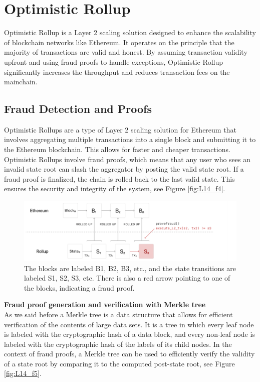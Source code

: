 \section{Optimistic Rollup}
Optimistic Rollup is a Layer 2 scaling solution designed to enhance the scalability of blockchain networks like Ethereum. It operates on the principle that the majority of transactions are valid and honest. By assuming transaction validity upfront and using fraud proofs to handle exceptions, Optimistic Rollup significantly increases the throughput and reduces transaction fees on the mainchain.
\subsection{Fraud Detection and Proofs}
Optimistic Rollups are a type of Layer 2 scaling solution for Ethereum that involves aggregating multiple transactions into a single block and submitting it to the Ethereum blockchain. This allows for faster and cheaper transactions.\\
Optimistic Rollups involve fraud proofs, which means that any user who sees an invalid state root can slash the aggregator by posting the valid state root. If a fraud proof is finalized, the chain is rolled back to the last valid state. This ensures the security and integrity of the system, see Figure \ref{fig:L14_f4}.\\
\begin{center}
	\begin{figure}
		\centering
		\includegraphics[width=0.8\linewidth]{Fig/14/F4}
		\caption{The blocks are labeled B1, B2, B3, etc., and the state transitions are labeled S1, S2, S3, etc. There is also a red arrow pointing to one of the blocks, indicating a fraud proof.
		}
		\label{fig:f4}
	\end{figure}
\end{center}
\textbf{Fraud proof generation and verification with Merkle tree}\\ As we said before a Merkle tree is a data structure that allows for efficient verification of the contents of large data sets. It is a tree in which every leaf node is labeled with the cryptographic hash of a data block, and every non-leaf node is labeled with the cryptographic hash of the labels of its child nodes. In the context of fraud proofs, a Merkle tree can be used to efficiently verify the validity of a state root by comparing it to the computed post-state root, see Figure \ref{fig:L14_f5}.
